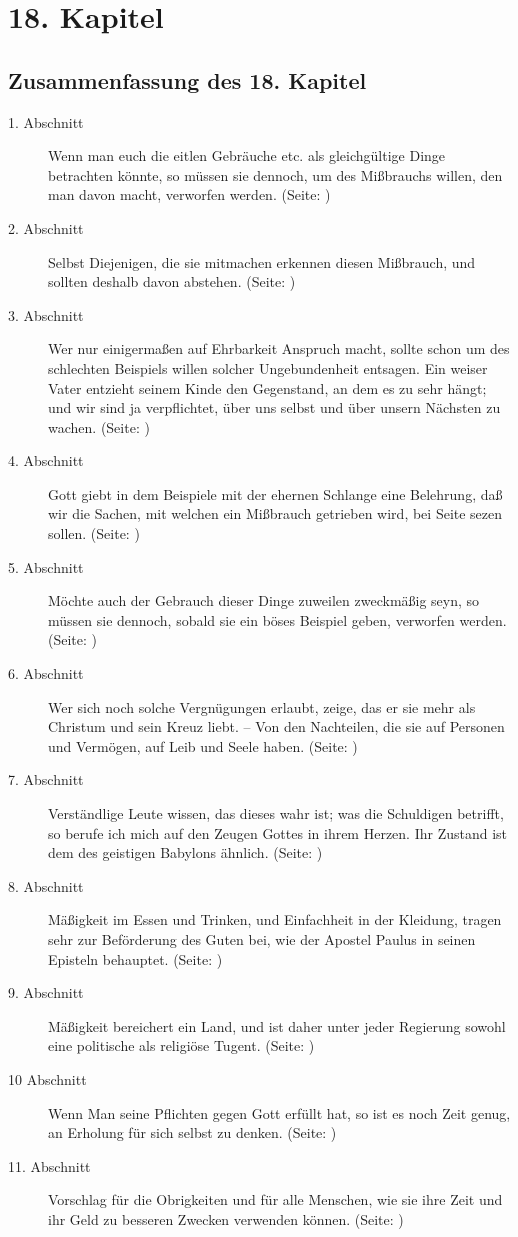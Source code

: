 
\chapter{18. Kapitel} \label{kap18}
\section{Zusammenfassung des 18. Kapitel}
\small
\begin{description}
\item[1. Abschnitt] Wenn man euch die eitlen Gebräuche etc. als gleichgültige
Dinge betrachten könnte, so müssen sie dennoch, um des Mißbrauchs willen, den
man davon macht, verworfen werden. (Seite: \pageref{kap18_ab1})
\item[2. Abschnitt] Selbst Diejenigen, die sie mitmachen erkennen diesen
Mißbrauch, und sollten deshalb davon abstehen. (Seite: \pageref{kap18_ab2})
\item[3. Abschnitt] Wer nur einigermaßen auf Ehrbarkeit Anspruch macht, sollte
schon um des schlechten Beispiels willen solcher Ungebundenheit entsagen. Ein
weiser Vater entzieht seinem Kinde den Gegenstand, an dem es zu sehr hängt; und
wir sind ja verpflichtet, über uns selbst und über unsern Nächsten zu wachen. (Seite: \pageref{kap18_ab3})
\item[4. Abschnitt] Gott giebt in dem Beispiele mit der ehernen Schlange eine
Belehrung, daß wir die Sachen, mit welchen ein Mißbrauch getrieben wird, bei
Seite sezen sollen. (Seite: \pageref{kap18_ab4})
\item[5. Abschnitt] Möchte auch der Gebrauch dieser Dinge zuweilen zweckmäßig
seyn, so müssen sie dennoch, sobald sie ein böses Beispiel geben, verworfen
werden. (Seite: \pageref{kap18_ab5})
\item[6. Abschnitt] Wer sich noch solche Vergnügungen erlaubt, zeige, das er sie
mehr als Christum und sein Kreuz liebt. -- Von den Nachteilen, die sie auf
Personen und Vermögen, auf Leib und Seele haben. (Seite: \pageref{kap18_ab6})
\item[7. Abschnitt] Verständlige Leute wissen, das dieses wahr ist; was die
Schuldigen betrifft, so berufe ich mich auf den Zeugen Gottes in ihrem Herzen.
Ihr Zustand ist dem des geistigen Babylons ähnlich. (Seite: \pageref{kap18_ab7})
\item[8. Abschnitt] Mäßigkeit im Essen und Trinken, und Einfachheit in der
Kleidung, tragen sehr zur Beförderung des Guten bei, wie der Apostel Paulus in
seinen Episteln behauptet. (Seite: \pageref{kap18_ab8})
\item[9. Abschnitt] Mäßigkeit bereichert ein Land, und ist daher unter jeder
Regierung sowohl eine politische als religiöse Tugent. (Seite: \pageref{kap18_ab9})
\item[10 Abschnitt] Wenn Man seine Pflichten gegen Gott erfüllt hat, so ist es
noch Zeit genug, an Erholung für sich selbst zu denken. (Seite: \pageref{kap18_ab10})
\item[11. Abschnitt] Vorschlag für die Obrigkeiten und für alle Menschen, wie
sie ihre Zeit und ihr Geld zu besseren Zwecken verwenden können. (Seite: \pageref{kap18_ab11})

\end{description}
\normalsize

